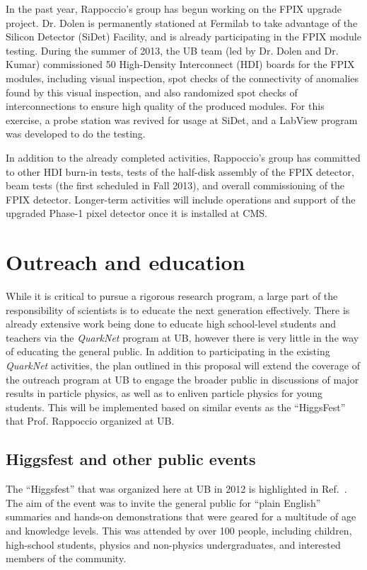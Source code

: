 \documentclass[12pt]{proposalnsf}
\begin{document}
In the past year, Rappoccio's group has begun working on the FPIX
upgrade project. Dr. Dolen is permanently stationed at Fermilab to
take advantage of the Silicon Detector (SiDet) Facility, and is
already participating in the FPIX module testing. During the
summer of 2013, the UB team (led by Dr. Dolen and Dr. Kumar)
commissioned 50 High-Density Interconnect
(HDI) boards for the FPIX modules, including visual inspection, spot
checks of the connectivity of anomalies found by this visual
inspection, and also randomized spot checks of interconnections to
ensure high quality of the produced modules. For this exercise, a
probe station was revived for usage at
SiDet, and a LabView program was developed to do the testing.

In addition to the already completed activities, Rappoccio's group has
committed to other HDI burn-in tests, tests of the half-disk assembly
of the FPIX detector, beam tests (the first scheduled in Fall 2013),
and overall commissioning of the FPIX detector. Longer-term activities
will include operations and support of the upgraded Phase-1 pixel
detector once it is installed at CMS. 


\clearpage


\section{Outreach and education}
\label{sec:outreach}


While it is critical to pursue a rigorous research program, a large
part of the responsibility of scientists is to educate the next
generation effectively. There is already extensive work being done to
educate high school-level students and teachers via the {\em QuarkNet}
program  at UB, however there is
very little in the way of educating the general
public. 
In addition to participating in the existing {\em QuarkNet}
activities, the plan outlined in this proposal will extend the coverage of the
outreach program at UB to engage the broader
public in discussions of major results in particle
physics, as well as to enliven particle physics for young students. 
This will be implemented based on similar events as the
``HiggsFest''~\cite{higgsfest} that Prof. Rappoccio organized at UB. 


\subsection{Higgsfest and other public events}

The ``Higgsfest'' that was organized here at UB in 2012
is highlighted in Ref.~\cite{higgsfest}. The aim of the event was to
invite the general public for ``plain English'' summaries and hands-on
demonstrations that were geared for a multitude of age and knowledge
levels. 
This was attended by over 100 people, including children,
high-school students, physics and non-physics undergraduates, and
interested members of the community. 
\end{document}
